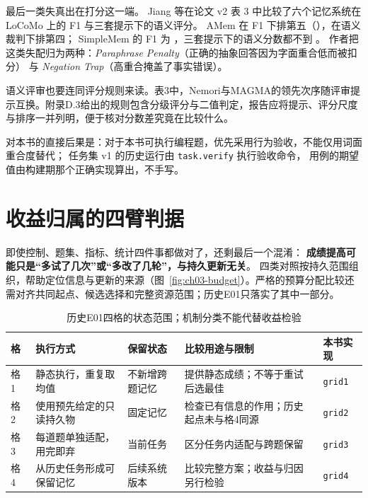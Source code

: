 \begin{sloppypar}
最后一类失真出在打分这一端。
Jiang 等在论文 v2 表 3 中比较了六个记忆系统在 LoCoMo 上的 F1 与三套提示下的语义评分。
AMem 在 F1 下排第五（），在语义裁判下排第四；
SimpleMem 的 F1 为 ，三套提示下的语义分数都不到 。
作者把这类失配归为两种：\emph{Paraphrase Penalty}（正确的抽象回答因为字面重合低而被扣分）
与 \emph{Negation Trap}（高重合掩盖了事实错误）。
\end{sloppypar}

语义评审也要连同评分规则来读。表3中，Nemori与MAGMA的领先次序随评审提示互换。附录D.3给出的规则包含分级评分与二值判定，报告应将提示、评分尺度与排序一并列明，便于核对分数差究竟在比较什么\cite{anatomy-memory-2602}。

\begin{sloppypar}
对本书的直接后果是：对于本书可执行编程题，优先采用行为验收，不能仅用词面重合度替代；
任务集 v1 的历史运行由 \texttt{task.verify} 执行验收命令，
用例的期望值由构建期那个正确实现算出，不手写。
\end{sloppypar}

\section{收益归属的四臂判据}
\label{sec:ch03-fourarms}

\begin{sloppypar}
即使控制、题集、指标、统计四件事都做对了，还剩最后一个混淆：
\textbf{成绩提高可能只是“多试了几次”或“多改了几轮”，与持久更新无关}。
四类对照按持久范围组织，帮助定位信息与更新的来源（图~\ref{fig:ch03-budget}）。严格的预算分配比较还需对齐共同起点、候选选择和完整资源范围；历史E01只落实了其中一部分。
\end{sloppypar}



\begin{table}[htbp]
\centering
\caption{历史E01四格的状态范围；机制分类不能代替收益检验}
\label{tab:ch03-fourarms}
\begin{small}
\begin{tabular}{>{\raggedright\arraybackslash}p{1.4cm}>{\raggedright\arraybackslash}p{3.4cm}>{\raggedright\arraybackslash}p{2.6cm}>{\raggedright\arraybackslash}p{4.4cm}>{\raggedright\arraybackslash}p{1.8cm}}
\toprule
格 & 执行方式 & 保留状态 & 比较用途与限制 & 本书实现 \\
\midrule
格 1 & 静态执行，重复取均值 & 不新增跨题记忆 & 提供静态成绩；不等于重试后选最佳 & \texttt{grid1} \\
\midrule
格 2 & 使用预先给定的只读持久物 & 固定记忆 & 检查已有信息的作用；历史起点未与格4同源 & \texttt{grid2} \\
\midrule
格 3 & 每道题单独适配，用完即弃 & 当前任务 & 区分任务内适配与跨题保留 & \texttt{grid3} \\
\midrule
格 4 & 从历史任务形成可保留记忆 & 后续系统版本 & 比较完整方案；收益与归因另行检验 & \texttt{grid4} \\
\bottomrule
\end{tabular}
\end{small}
\end{table}

